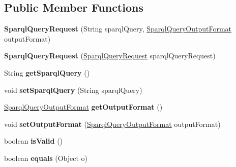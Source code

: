 \subsection*{Public Member Functions}
\begin{DoxyCompactItemize}
\item 
\mbox{\label{classeu_1_1h2020_1_1symbiote_1_1core_1_1ci_1_1SparqlQueryRequest_a98d1404fb3a594d82bf25fc15bbff71c}} 
{\bfseries Sparql\+Query\+Request} (String sparql\+Query, \hyperlink{enumeu_1_1h2020_1_1symbiote_1_1core_1_1ci_1_1SparqlQueryOutputFormat}{Sparql\+Query\+Output\+Format} output\+Format)
\item 
\mbox{\label{classeu_1_1h2020_1_1symbiote_1_1core_1_1ci_1_1SparqlQueryRequest_a1b785ac6b0fc3c25462ff49703ed505e}} 
{\bfseries Sparql\+Query\+Request} (\hyperlink{classeu_1_1h2020_1_1symbiote_1_1core_1_1ci_1_1SparqlQueryRequest}{Sparql\+Query\+Request} sparql\+Query\+Request)
\item 
\mbox{\label{classeu_1_1h2020_1_1symbiote_1_1core_1_1ci_1_1SparqlQueryRequest_a023587b8826d4b54c29c5aa60c0772eb}} 
String {\bfseries get\+Sparql\+Query} ()
\item 
\mbox{\label{classeu_1_1h2020_1_1symbiote_1_1core_1_1ci_1_1SparqlQueryRequest_afb2bba89ada1e5d361dc532e0b0f8271}} 
void {\bfseries set\+Sparql\+Query} (String sparql\+Query)
\item 
\mbox{\label{classeu_1_1h2020_1_1symbiote_1_1core_1_1ci_1_1SparqlQueryRequest_a9b62286f091f5d738d92ca212036a6fc}} 
\hyperlink{enumeu_1_1h2020_1_1symbiote_1_1core_1_1ci_1_1SparqlQueryOutputFormat}{Sparql\+Query\+Output\+Format} {\bfseries get\+Output\+Format} ()
\item 
\mbox{\label{classeu_1_1h2020_1_1symbiote_1_1core_1_1ci_1_1SparqlQueryRequest_a321cbc9e84ba7686c77c8ef59b6e955c}} 
void {\bfseries set\+Output\+Format} (\hyperlink{enumeu_1_1h2020_1_1symbiote_1_1core_1_1ci_1_1SparqlQueryOutputFormat}{Sparql\+Query\+Output\+Format} output\+Format)
\item 
\mbox{\label{classeu_1_1h2020_1_1symbiote_1_1core_1_1ci_1_1SparqlQueryRequest_af387a21f352461287417a019c986c85f}} 
boolean {\bfseries is\+Valid} ()
\item 
\mbox{\label{classeu_1_1h2020_1_1symbiote_1_1core_1_1ci_1_1SparqlQueryRequest_adb8961e597733ada6dd12e9d1fa1d17e}} 
boolean {\bfseries equals} (Object o)
\end{DoxyCompactItemize}


